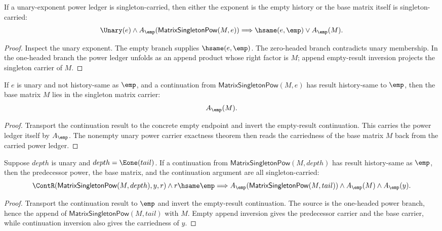 \begin{theorem}
\label{thm:matrix-singleton-pow-unary-exponent-carrier-or-base-carrier}
If a unary-exponent power ledger is singleton-carried, then either the exponent
is the empty history or the base matrix itself is singleton-carried:
$$
\Unary(e)\land A_{\emp}(\mathsf{MatrixSingletonPow}(M,e))
\Longrightarrow
\hsame(e,\emp)\vee A_{\emp}(M).
$$
\end{theorem}
\begin{proof}
Inspect the unary exponent. The empty branch supplies \(\hsame(e,\emp)\).
The zero-headed branch contradicts unary membership. In the one-headed branch
the power ledger unfolds as an append product whose right factor is \(M\);
append empty-result inversion projects the singleton carrier of \(M\).
\end{proof}

\begin{theorem}
\label{thm:matrix-singleton-pow-positive-exponent-empty-continuation-base-carrier}
If \(e\) is unary and not history-same as \(\emp\), and a continuation from
\(\mathsf{MatrixSingletonPow}(M,e)\) has result history-same to \(\emp\), then
the base matrix \(M\) lies in the singleton matrix carrier:
$$
A_{\emp}(M).
$$
\end{theorem}
\begin{proof}
Transport the continuation result to the concrete empty endpoint and invert
the empty-result continuation. This carries the power ledger itself by
\(A_{\emp}\). The nonempty unary power carrier exactness theorem then reads
the carriedness of the base matrix \(M\) back from the carried power ledger.
\end{proof}

\begin{theorem}
\label{thm:matrix-singleton-pow-positive-tail-empty-continuation-factors}
Suppose $depth$ is unary and $depth=\Eone(tail)$. If a continuation from
$\mathsf{MatrixSingletonPow}(M,depth)$ has result history-same as $\emp$, then
the predecessor power, the base matrix, and the continuation argument are all
singleton-carried:
$$
\ContR(\mathsf{MatrixSingletonPow}(M,depth),y,r)\land r\hsame\emp
\Longrightarrow
A_{\emp}(\mathsf{MatrixSingletonPow}(M,tail))\land A_{\emp}(M)\land
A_{\emp}(y).
$$
\end{theorem}
\begin{proof}
Transport the continuation result to $\emp$ and invert the empty-result
continuation. The source is the one-headed power branch, hence the append of
$\mathsf{MatrixSingletonPow}(M,tail)$ with $M$. Empty append inversion gives
the predecessor carrier and the base carrier, while continuation inversion
also gives the carriedness of $y$.
\end{proof}

